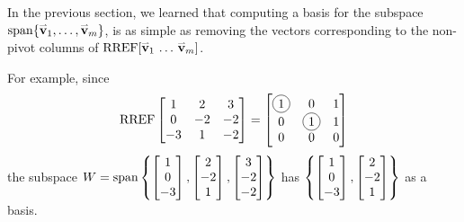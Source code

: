 \begin{observation}
  In the previous section, we learned that
  computing a basis for the subspace \(\operatorname{span}\{\mathbf{\accentset{\rightharpoonup}{v}}_1,\dots,\mathbf{\accentset{\rightharpoonup}{v}}_m\}\),
  is as simple as removing the vectors corresponding to the non-pivot columns of
  \(\operatorname{RREF}[\mathbf{\accentset{\rightharpoonup}{v}}_1\,\dots\,\mathbf{\accentset{\rightharpoonup}{v}}_m]\).

  \vspace{1em}

  For example, since
  \[
    \RREF
    \begin{bmatrix}
      1 & 2 & 3 \\
      0 & -2 & -2 \\
      -3 & 1 & -2
    \end{bmatrix}
      =
    \begin{bmatrix}
      \circledNumber{1} & 0 & 1 \\
      0 & \circledNumber{1} & 1 \\
      0 & 0 & 0
    \end{bmatrix}
  \]
  the subspace
  \(
    W=\operatorname{span}\left\{
      \begin{bmatrix}1\\0\\-3\end{bmatrix},
      \begin{bmatrix}2\\-2\\1\end{bmatrix},
      \begin{bmatrix}3\\-2\\-2\end{bmatrix}
    \right\}
  \)
  has
  \(
    \left\{
      \begin{bmatrix}1\\0\\-3\end{bmatrix},
      \begin{bmatrix}2\\-2\\1\end{bmatrix}
    \right\}
  \)
  as a basis.
\end{observation}

